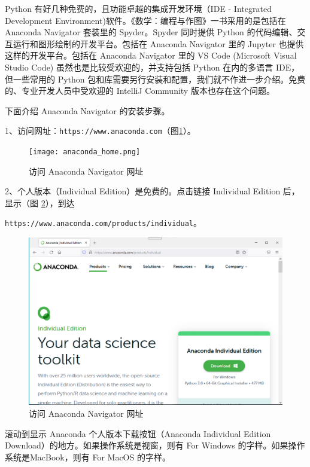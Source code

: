 \documentclass[main.tex]{subfiles}
\begin{document}
	
Python 有好几种免费的，且功能卓越的集成开发环境（IDE - Integrated Development Environment)软件。《数学：编程与作图》一书采用的是包括在
Anaconda Navigator  套装里的 Spyder。Spyder 同时提供 Python 的代码编辑、交互运行和图形绘制的开发平台。包括在 Anaconda Navigator 里的 Jupyter 也提供这样的开发平台。包括在 Anaconda Navigator 里的 VS Code (Microsoft Visual Studio Code) 虽然也是比较受欢迎的，并支持包括 Python 在内的多语言 IDE，但一些常用的 Python 包和库需要另行安装和配置，我们就不作进一步介绍。免费的、专业开发人员中受欢迎的 IntelliJ Community 版本也存在这个问题。

下面介绍 Anaconda Navigator 的安装步骤。

1、访问网址：\verb|https://www.anaconda.com|（图\ref{fig:1.1}）。

\begin{figure}[h]
	\centering
	\texttt{[image: anaconda\_home.png]}
	\caption{访问 Anaconda Navigator 网址}
	\label{fig:1.1}
\end{figure}

2、个人版本（Individual Edition）是免费的。点击链接 Individual Edition  后，显示（图 \ref{fig:1.2}），到达

\verb|https://www.anaconda.com/products/individual|。

\begin{figure}[h]
	\centering
	\includegraphics[width=1.0\textwidth]{anaconda_download.png}
	\caption{访问 Anaconda Navigator 网址}
	\label{fig:1.2}
\end{figure}

滚动到显示 Anaconda 个人版本下载按钮（Anaconda Individual Edition Download）的地方。如果操作系统是视窗，则有 For Windows 的字样。如果操作系统是MacBook，则有 For MacOS 的字样。
\end{document}
